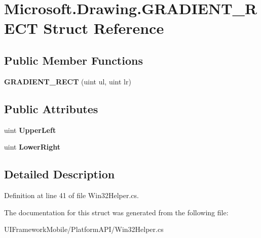 \hypertarget{struct_microsoft_1_1_drawing_1_1_g_r_a_d_i_e_n_t___r_e_c_t}{
\section{Microsoft.Drawing.GRADIENT\_\-RECT Struct Reference}
\label{struct_microsoft_1_1_drawing_1_1_g_r_a_d_i_e_n_t___r_e_c_t}
}
\subsection*{Public Member Functions}
\begin{DoxyCompactItemize}
\item 
\hypertarget{struct_microsoft_1_1_drawing_1_1_g_r_a_d_i_e_n_t___r_e_c_t_a4b124fd12756744e79ea9f73671fea4b}{
{\bfseries GRADIENT\_\-RECT} (uint ul, uint lr)}
\label{struct_microsoft_1_1_drawing_1_1_g_r_a_d_i_e_n_t___r_e_c_t_a4b124fd12756744e79ea9f73671fea4b}

\end{DoxyCompactItemize}
\subsection*{Public Attributes}
\begin{DoxyCompactItemize}
\item 
\hypertarget{struct_microsoft_1_1_drawing_1_1_g_r_a_d_i_e_n_t___r_e_c_t_a3c56d4f88913d70a46d5ea5b92826f3f}{
uint {\bfseries UpperLeft}}
\label{struct_microsoft_1_1_drawing_1_1_g_r_a_d_i_e_n_t___r_e_c_t_a3c56d4f88913d70a46d5ea5b92826f3f}

\item 
\hypertarget{struct_microsoft_1_1_drawing_1_1_g_r_a_d_i_e_n_t___r_e_c_t_a1e508f6ab67141b1c595e12e4940c1b9}{
uint {\bfseries LowerRight}}
\label{struct_microsoft_1_1_drawing_1_1_g_r_a_d_i_e_n_t___r_e_c_t_a1e508f6ab67141b1c595e12e4940c1b9}

\end{DoxyCompactItemize}


\subsection{Detailed Description}


Definition at line 41 of file Win32Helper.cs.

The documentation for this struct was generated from the following file:\begin{DoxyCompactItemize}
\item 
UIFrameworkMobile/PlatformAPI/Win32Helper.cs\end{DoxyCompactItemize}
